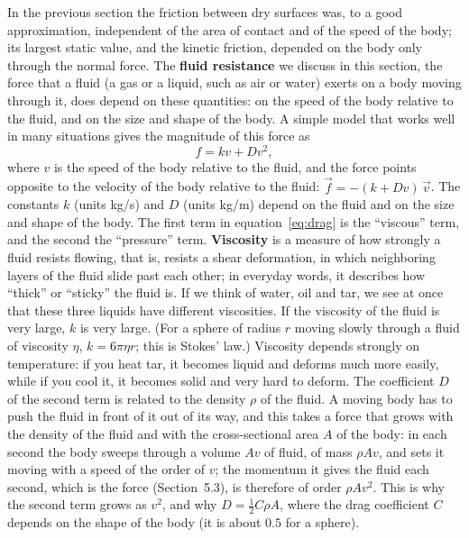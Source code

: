 \documentclass[11pt,a4paper]{article}
\begin{document}
In the previous section the friction between dry surfaces was, to a good approximation, independent of
the area of contact and of the speed of the body; its largest static value, and the kinetic friction,
depended on the body only through the normal force. The \textbf{fluid resistance} we discuss in this section, the force that a fluid (a gas or a
liquid, such as air or water) exerts on a body moving through it, does depend on these quantities: on
the speed of the body relative to the fluid, and on the size and shape of the body. A simple model that
works well in many situations gives the magnitude of this force as
\begin{equation}\label{eq:drag}
  f = kv + Dv^2 ,
\end{equation}
where $v$ is the speed of the body relative to the fluid, and the force points opposite to the
velocity of the body relative to the fluid: $\vec{f} = -(k + Dv)\,\vec{v}$. The constants $k$ (units
\unit{kg/s}) and $D$ (units \unit{kg/m}) depend on the fluid and on the size and shape of the body.
The first term in equation~\eqref{eq:drag} is the ``viscous'' term, and the second the ``pressure''
term. \textbf{Viscosity} is a measure of how strongly a fluid resists flowing, that is, resists a shear
deformation, in which neighboring layers of the fluid slide past each other; in everyday words, it
describes how ``thick'' or ``sticky'' the fluid is. If we think of water, oil and tar, we see at once
that these three liquids have different viscosities. If the viscosity of the fluid is very large, $k$
is very large. (For a sphere of radius $r$ moving slowly through a fluid of viscosity $\eta$,
$k = 6\pi\eta r$; this is Stokes' law.) Viscosity depends strongly on temperature: if you heat tar, it
becomes liquid and deforms much more easily, while if you cool it, it becomes solid and very hard to
deform. The coefficient $D$ of the second term is related to the density $\rho$ of the fluid. A moving
body has to push the fluid in front of it out of its way, and this takes a force that grows with the
density of the fluid and with the cross-sectional area $A$ of the body: in each second the body sweeps
through a volume $Av$ of fluid, of mass $\rho A v$, and sets it moving with a speed of the order of $v$;
the momentum it gives the fluid each second, which is the force (Section~5.3), is therefore of order
$\rho A v^2$. This is why the second term grows as $v^2$, and why $D = \tfrac12 C\rho A$, where
the drag coefficient $C$ depends on the shape of the body (it is about $0.5$ for a sphere).
\end{document}
